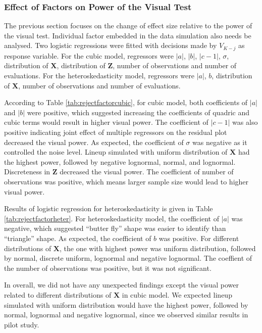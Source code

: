 \documentclass{monashthesis}
\theoremstyle{definition}
\theoremstyle{definition}
\theoremstyle{definition}
\theoremstyle{definition}
\theoremstyle{remark}
\begin{document}
\hypertarget{effect-of-factors-on-power-of-the-visual-test}{%
\subsubsection{Effect of Factors on Power of the Visual Test}\label{effect-of-factors-on-power-of-the-visual-test}}

The previous section focuses on the change of effect size relative to the power of the visual test. Individual factor embedded in the data simulation also needs be analysed. Two logistic regressions were fitted with decisions made by \(V_{K-j}\) as response variable. For the cubic model, regressors were \(|a|\), \(|b|\), \(|c-1|\), \(\sigma\), distribution of \(\boldsymbol{X}\), distribution of \(\boldsymbol{Z}\), number of observations and number of evaluations. For the heteroskedasticity model, regressors were \(|a|\), \(b\), distribution of \(\boldsymbol{X}\), number of observations and number of evaluations.

According to Table \ref{tab:rejectfactorcubic}, for cubic model, both coefficients of \(|a|\) and \(|b|\) were positive, which suggested increasing the coefficients of quadric and cubic terms would result in higher visual power. The coefficient of \(|c-1|\) was also positive indicating joint effect of multiple regressors on the residual plot decreased the visual power. As expected, the coefficient of \(\sigma\) was negative as it controlled the noise level. Lineup simulated with uniform distribution of \(\boldsymbol{X}\) had the highest power, followed by negative lognormal, normal, and lognormal. Discreteness in \(\boldsymbol{Z}\) decreased the visual power. The coefficient of number of observations was positive, which means larger sample size would lead to higher visual power.

Results of logistic regression for heteroskedasticity is given in Table \ref{tab:rejectfactorheter}. For heteroskedasticity model, the coefficient of \(|a|\) was negative, which suggested ``butter fly'' shape was easier to identify than ``triangle'' shape. As expected, the coefficient of \(b\) was positive. For different distributions of \(\boldsymbol{X}\), the one with highest power was uniform distribution, followed by normal, discrete uniform, lognormal and negative lognormal. The coeffient of the number of observations was positive, but it was not significant.

In overall, we did not have any unexpected findings except the visual power related to different distributions of \(\boldsymbol{X}\) in cubic model. We expected lineup simulated with uniform distribution would have the highest power, followed by normal, lognormal and negative lognormal, since we observed similar results in pilot study.
\end{document}
